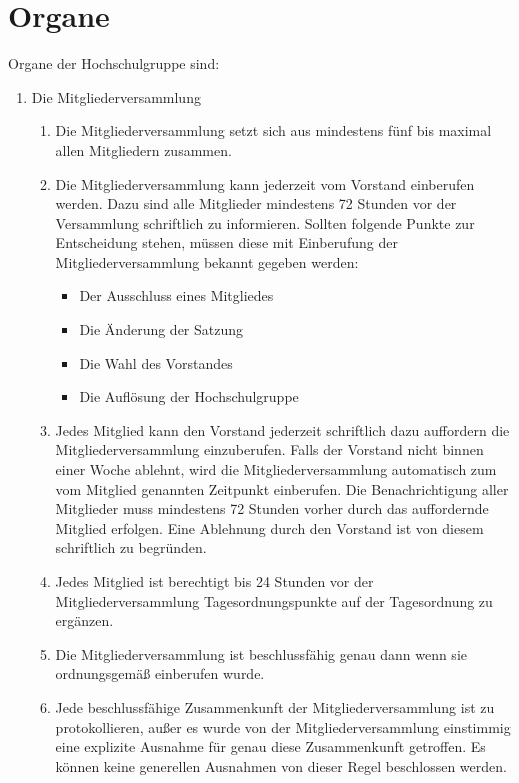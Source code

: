 \documentclass[11pt]{article}
\begin{document}
	\section{Organe}
	Organe der Hochschulgruppe sind:
	\begin{enumerate}
		\item Die Mitgliederversammlung
		\begin{enumerate}
			\item Die Mitgliederversammlung setzt sich aus mindestens fünf bis maximal allen Mitgliedern zusammen.
			\item Die Mitgliederversammlung kann jederzeit vom Vorstand einberufen werden. Dazu sind alle Mitglieder mindestens 72 Stunden vor der Versammlung schriftlich zu informieren. Sollten folgende Punkte zur Entscheidung stehen, müssen diese mit Einberufung der Mitgliederversammlung bekannt gegeben werden:
            \begin{itemize}
                \item Der Ausschluss eines Mitgliedes
                \item Die Änderung der Satzung
                \item Die Wahl des Vorstandes
                \item Die Auflösung der Hochschulgruppe
            \end{itemize}
			\item Jedes Mitglied kann den Vorstand jederzeit schriftlich dazu auffordern die Mitgliederversammlung einzuberufen. Falls der Vorstand nicht binnen einer Woche ablehnt, wird die Mitgliederversammlung automatisch zum vom Mitglied genannten Zeitpunkt einberufen. Die Benachrichtigung aller Mitglieder muss mindestens 72 Stunden vorher durch das auffordernde Mitglied erfolgen. Eine Ablehnung durch den Vorstand ist von diesem schriftlich zu begründen.
            \item Jedes Mitglied ist berechtigt bis 24 Stunden vor der Mitgliederversammlung Tagesordnungspunkte auf der Tagesordnung zu ergänzen.
			\item Die Mitgliederversammlung ist beschlussfähig genau dann wenn sie ordnungsgemäß einberufen wurde.
			\item Jede beschlussfähige Zusammenkunft der Mitgliederversammlung ist zu protokollieren, außer es wurde von der Mitgliederversammlung einstimmig eine explizite Ausnahme für genau diese Zusammenkunft getroffen. Es können keine generellen Ausnahmen von dieser Regel beschlossen werden.
            \begin{itemize}

\end{itemize}
\end{enumerate}
\end{enumerate}
\end{document}
